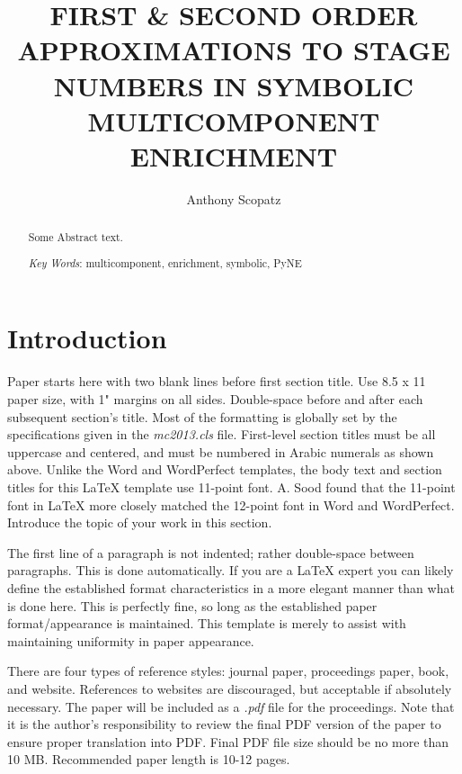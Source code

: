 \documentclass{ansconf}
\begin{document}
\title{FIRST \& SECOND ORDER APPROXIMATIONS TO STAGE NUMBERS IN SYMBOLIC 
       MULTICOMPONENT ENRICHMENT}

\author{Anthony Scopatz}

\maketitle

\begin{abstract}
\raggedright
Some Abstract text.

\emph{Key Words}: multicomponent, enrichment, symbolic, PyNE
\end{abstract}

\section{Introduction}

Paper starts here with two blank lines before first section title.  Use 
8.5 x 11 paper size, with 1" margins on all sides.  Double-space before and
after each subsequent section's title.  Most of the formatting is globally
set by the specifications given in the {\it mc2013.cls} file.  
First-level section titles must be all uppercase and centered, and must 
be numbered in Arabic numerals as shown above.  Unlike the Word and WordPerfect
templates, the body text and section titles for this {\LaTeX} template use 
11-point font.  A. Sood found that the 11-point font in {\LaTeX} more closely 
matched the 12-point font in Word and WordPerfect.  Introduce the topic of 
your work in this section.

The first line of a paragraph is not indented; rather double-space between 
paragraphs.  This is done automatically. If you are a {\LaTeX} expert you 
can likely define the established format characteristics in a more elegant 
manner than what is done here.  This is perfectly fine, so long as the 
established paper format/appearance is maintained.  This template is merely 
to assist with maintaining uniformity in paper appearance.

There are four types of reference styles: journal paper\cite{journal},
proceedings paper\cite{proc_paper}, book\cite{book}, and website\cite{techrep}.
References to websites are discouraged, but acceptable if absolutely necessary.
The paper will be included as a {\it .pdf} file for the proceedings. Note that
it is the author's responsibility to review the final PDF version of the paper
to ensure proper translation into PDF.  Final PDF file size should be no more
than 10 MB. Recommended paper length is 10-12 pages.
\end{document}
